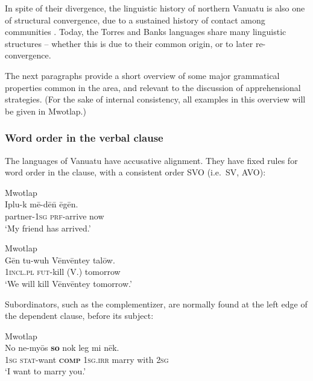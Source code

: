 \documentclass[output=paper,colorlinks,citecolor=brown]{langscibook}
\begin{document}
In spite of their divergence, the linguistic history of northern Vanuatu is also one of structural convergence, due to a sustained history of contact among communities \citep{François2011}. Today, the Torres and Banks languages share many linguistic structures -- whether this is due to their common origin, or to later re-convergence. 

The next paragraphs provide a short overview of some major grammatical properties common in the area, and relevant to the discussion of apprehensional strategies. (For the sake of internal consistency, all examples in this overview will be given in Mwotlap.)




\subsubsection{Word order in the verbal clause}
\label{subsubsec:wordorder}

The languages of Vanuatu have accusative alignment. They have fixed rules for word order in the clause, with a consistent order SVO (i.e.\ SV, AVO):

\ea \label{ex:Fra5} \textnormal{Mwotlap}\\
\gll Iplu-k mē-dē\={n} ēgēn. \\
partner-\textsc{1sg} \textsc{prf}-arrive now \\
\glt `My friend has arrived.' 
\z

    \ea \label{ex:Fra6} \textnormal{Mwotlap} \\
\gll Gēn tu-wuh Vēnvēntey talōw. \\
\textsc{1incl.pl} \textsc{fut}-kill (V.) tomorrow \\
\glt `We will kill Vēnvēntey tomorrow.' 
\z

Subordinators, such as the complementizer, are normally found at the left edge of the dependent clause, before its subject:
 
    \ea \label{ex:Fra7} \textnormal{Mwotlap} \\
\gll No ne-myōs \textbf{so} nok leg mi nēk. \\
\textsc{1sg} \textsc{stat}-want \textsc{\textbf{comp}} \textsc{1sg.irr} marry with \textsc{2sg} \\
\glt `I want to marry you.' 
\z
\end{document}
